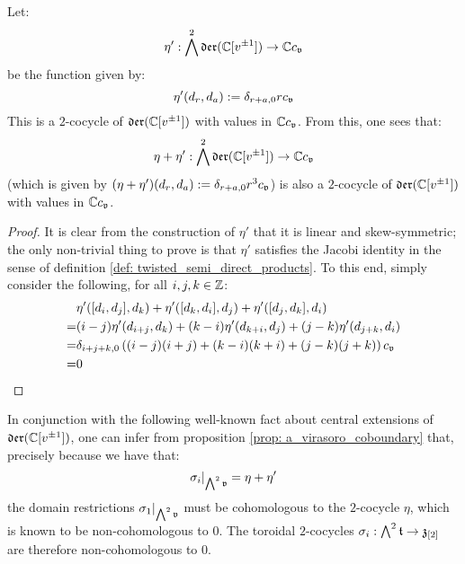         \begin{proposition} \label{prop: a_virasoro_coboundary}
            Let:
                $$\eta': \bigwedge^2 \mathfrak{der}(\mathbb{C}[v^{\pm 1}]) \to \mathbb{C} c_{\mathfrak{v}}$$
            be the function given by:
                $$\eta'(d_r, d_a) := \delta_{r + a, 0} r c_{\mathfrak{v}}$$
            This is a $2$-cocycle of $\mathfrak{der}(\mathbb{C}[v^{\pm 1}])$ with values in $\mathbb{C} c_{\mathfrak{v}}$. From this, one sees that:
                $$\eta + \eta': \bigwedge^2 \mathfrak{der}(\mathbb{C}[v^{\pm 1}]) \to \mathbb{C} c_{\mathfrak{v}}$$
            (which is given by $(\eta + \eta')(d_r, d_a) := \delta_{r + a, 0} r^3 c_{\mathfrak{v}}$) is also a $2$-cocycle of $\mathfrak{der}(\mathbb{C}[v^{\pm 1}])$ with values in $\mathbb{C} c_{\mathfrak{v}}$. 
        \end{proposition}
            \begin{proof}
                It is clear from the construction of $\eta'$ that it is linear and skew-symmetric; the only non-trivial thing to prove is that $\eta'$ satisfies the Jacobi identity in the sense of definition \ref{def: twisted_semi_direct_products}. To this end, simply consider the following, for all $i, j, k \in \mathbb{Z}$:
                    $$
                        \begin{aligned}
                            & \eta'([d_i, d_j], d_k) + \eta'([d_k, d_i], d_j) + \eta'([d_j, d_k], d_i)
                            \\
                            = & (i - j) \eta'(d_{i + j}, d_k) + (k - i) \eta'(d_{k + i}, d_j) + (j - k) \eta'(d_{j + k}, d_i)
                            \\
                            = & \delta_{i + j + k, 0} \left( (i - j) (i + j) + (k - i) (k + i) + (j - k) (j + k) \right) c_{\mathfrak{v}}
                            \\
                            = & 0
                        \end{aligned}
                    $$
            \end{proof}
        In conjunction with the following well-known fact about central extensions of $\mathfrak{der}(\mathbb{C}[v^{\pm 1}])$, one can infer from proposition \ref{prop: a_virasoro_coboundary} that, precisely because we have that:
            $$\sigma_i|_{ \bigwedge^2 \mathfrak{v} } = \eta + \eta'$$
        the domain restrictions $\sigma_1|_{ \bigwedge^2 \mathfrak{v} }$ must be cohomologous to the $2$-cocycle $\eta$, which is known to be non-cohomologous to $0$. The toroidal $2$-cocycles $\sigma_i: \bigwedge^2 \mathfrak{t} \to \mathfrak{z}_{[2]}$ are therefore non-cohomologous to $0$.
